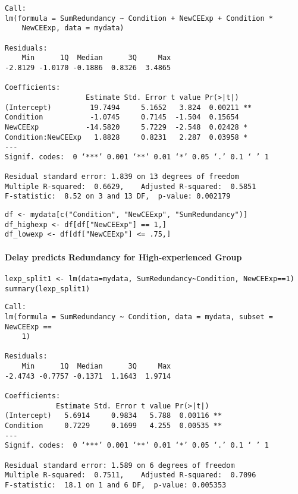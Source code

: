\documentclass[10pt]{article}
\begin{document}
\begin{verbatim}
Call:
lm(formula = SumRedundancy ~ Condition + NewCEExp + Condition * 
    NewCEExp, data = mydata)

Residuals:
    Min      1Q  Median      3Q     Max 
-2.8129 -1.0170 -0.1886  0.8326  3.4865 

Coefficients:
                   Estimate Std. Error t value Pr(>|t|)   
(Intercept)         19.7494     5.1652   3.824  0.00211 **
Condition           -1.0745     0.7145  -1.504  0.15654   
NewCEExp           -14.5820     5.7229  -2.548  0.02428 * 
Condition:NewCEExp   1.8828     0.8231   2.287  0.03958 * 
---
Signif. codes:  0 ‘***’ 0.001 ‘**’ 0.01 ‘*’ 0.05 ‘.’ 0.1 ‘ ’ 1

Residual standard error: 1.839 on 13 degrees of freedom
Multiple R-squared:  0.6629,	Adjusted R-squared:  0.5851 
F-statistic:  8.52 on 3 and 13 DF,  p-value: 0.002179
\end{verbatim}

\begin{verbatim}
df <- mydata[c("Condition", "NewCEExp", "SumRedundancy")]
df_highexp <- df[df["NewCEExp"] == 1,]
df_lowexp <- df[df["NewCEExp"] <= .75,]
\end{verbatim}

\paragraph*{Delay predicts Redundancy for High-experienced Group}
\label{sec-2-4-2-1}

\begin{verbatim}
lexp_split1 <- lm(data=mydata, SumRedundancy~Condition, NewCEExp==1)
summary(lexp_split1)
\end{verbatim}

\begin{verbatim}
Call:
lm(formula = SumRedundancy ~ Condition, data = mydata, subset = NewCEExp == 
    1)

Residuals:
    Min      1Q  Median      3Q     Max 
-2.4743 -0.7757 -0.1371  1.1643  1.9714 

Coefficients:
            Estimate Std. Error t value Pr(>|t|)   
(Intercept)   5.6914     0.9834   5.788  0.00116 **
Condition     0.7229     0.1699   4.255  0.00535 **
---
Signif. codes:  0 ‘***’ 0.001 ‘**’ 0.01 ‘*’ 0.05 ‘.’ 0.1 ‘ ’ 1

Residual standard error: 1.589 on 6 degrees of freedom
Multiple R-squared:  0.7511,	Adjusted R-squared:  0.7096 
F-statistic:  18.1 on 1 and 6 DF,  p-value: 0.005353
\end{verbatim}
\end{document}

